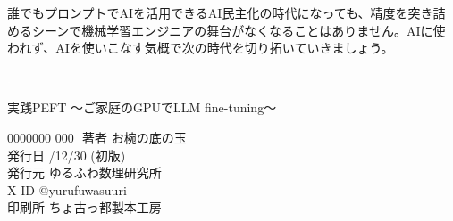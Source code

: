 \documentclass[a5paper,twoside,dvipdfmx]{jsarticle}
\begin{document}
誰でもプロンプトでAIを活用できるAI民主化の時代になっても、精度を突き詰めるシーンで機械学習エンジニアの舞台がなくなることはありません。AIに使われず、AIを使いこなす気概で次の時代を切り拓いていきましょう。

\newpage

\thispagestyle{empty} 

\textcolor{white}{.}
\vspace{\baselineskip}
\vspace{\baselineskip}
\vspace{\baselineskip}
\vspace{\baselineskip}
\vspace{\baselineskip}
\vspace{\baselineskip}
\vspace{\baselineskip}
\vspace{\baselineskip}
\vspace{\baselineskip}
\vspace{\baselineskip}
\vspace{\baselineskip}
\vspace{\baselineskip}
\vspace{\baselineskip}
\vspace{\baselineskip}
\vspace{\baselineskip}
\vspace{\baselineskip}
\vspace{\baselineskip}
\begin{screen}

実践PEFT ～ご家庭のGPUでLLM fine-tuning～

\begin{tabbing}
  0000000 \= 000 \= \kill
  著者 \> お椀の底の玉 \\
  発行日 /12/30 (初版) \\
  発行元 \> ゆるふわ数理研究所　\\
  X ID \> @yurufuwasuuri \\
  印刷所 \> ちょ古っ都製本工房
\end{tabbing}

\end{screen}

\vspace{\baselineskip}



\end{document}
